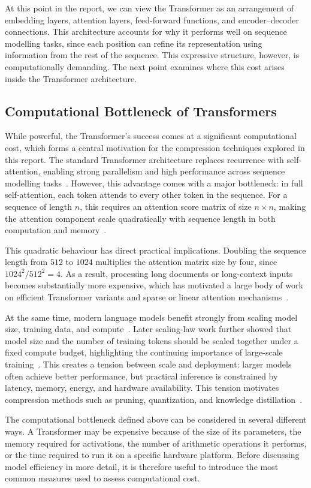 At this point in the report, we can view the Transformer as an arrangement of embedding layers, attention layers, feed-forward functions, and encoder--decoder connections. This architecture accounts for why it performs well on sequence modelling tasks, since each position can refine its representation using information from the rest of the sequence. This expressive structure, however, is computationally demanding. The next point examines where this cost arises inside the Transformer architecture.

\subsection{Computational Bottleneck of Transformers}
\label{sec:transformer_bottleneck}
While powerful, the Transformer's success comes at a significant computational cost, which forms a central motivation for the compression techniques explored in this report. The standard Transformer architecture replaces recurrence with self-attention, enabling strong parallelism and high performance across sequence modelling tasks~\cite{vaswani2017attention}. However, this advantage comes with a major bottleneck: in full self-attention, each token attends to every other token in the sequence. For a sequence of length $n$, this requires an attention score matrix of size $n \times n$, making the attention component scale quadratically with sequence length in both computation and memory~\cite{beltagy2020longformer,tay2020efficient}.

This quadratic behaviour has direct practical implications. Doubling the sequence length from $512$ to $1024$ multiplies the attention matrix size by four, since $1024^2 / 512^2 = 4$. As a result, processing long documents or long-context inputs becomes substantially more expensive, which has motivated a large body of work on efficient Transformer variants and sparse or linear attention mechanisms~\cite{beltagy2020longformer,tay2020efficient}.

At the same time, modern language models benefit strongly from scaling model size, training data, and compute~\cite{kaplan2020scaling}. Later scaling-law work further showed that model size and the number of training tokens should be scaled together under a fixed compute budget, highlighting the continuing importance of large-scale training~\cite{hoffmann2022training}. This creates a tension between scale and deployment: larger models often achieve better performance, but practical inference is constrained by latency, memory, energy, and hardware availability. This tension motivates compression methods such as pruning, quantization, and knowledge distillation~\cite{han2015deep,sanh2019distilbert}.



The computational bottleneck defined above can be considered in several different ways. A Transformer may be expensive because of the size of its parameters, the memory required for activations, the number of arithmetic operations it performs, or the time required to run it on a specific hardware platform. Before discussing model efficiency in more detail, it is therefore useful to introduce the most common measures used to assess computational cost.
